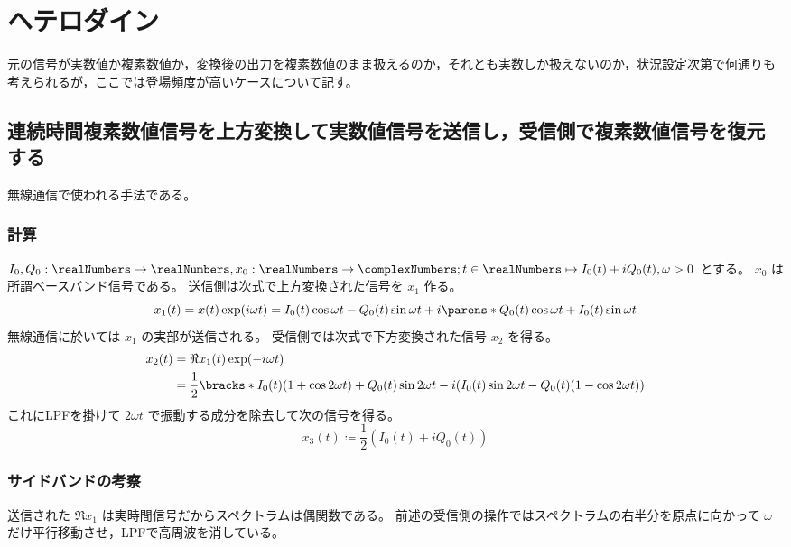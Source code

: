 \chapter{ヘテロダイン}
    元の信号が実数値か複素数値か，変換後の出力を複素数値のまま扱えるのか，それとも実数しか扱えないのか，状況設定次第で何通りも考えられるが，ここでは登場頻度が高いケースについて記す。
    \section{連続時間複素数値信号を上方変換して実数値信号を送信し，受信側で複素数値信号を復元する}
        無線通信で使われる手法である。
        \subsection{計算}
            $I_0, Q_0:\realNumbers\to\realNumbers,x_0:\realNumbers\to\complexNumbers; t\in\realNumbers\mapsto I_0(t) + iQ_0(t),\omega > 0$ とする。
            $x_0$ は所謂ベースバンド信号である。
            送信側は次式で上方変換された信号を $x_1$ 作る。
            \[ x_1(t) = x(t)\exp(i\omega t) = I_0(t)\cos\omega t - Q_0(t)\sin\omega t + i\parens*{Q_0(t)\cos\omega t + I_0(t)\sin\omega t} \]
            無線通信に於いては $x_1$ の実部が送信される。
            受信側では次式で下方変換された信号 $x_2$ を得る。
            \begin{align*}
                x_2(t) &= \Re{x_1(t)}\exp(-i\omega t) \\
                &= \frac{1}{2}\bracks*{I_0(t)(1+\cos 2\omega t) + Q_0(t)\sin 2\omega t - i(I_0(t)\sin 2\omega t - Q_0(t)(1-\cos 2\omega t))}
            \end{align*}
            これにLPFを掛けて $2\omega t$ で振動する成分を除去して次の信号を得る。
            \[ x_3(t) \coloneq \frac{1}{2}(I_0(t) + iQ_0(t)) \]
        \subsection{サイドバンドの考察}
            送信された $\Re{x_1}$ は実時間信号だからスペクトラムは偶関数である。
            前述の受信側の操作ではスペクトラムの右半分を原点に向かって $\omega$ だけ平行移動させ，LPFで高周波を消している。

